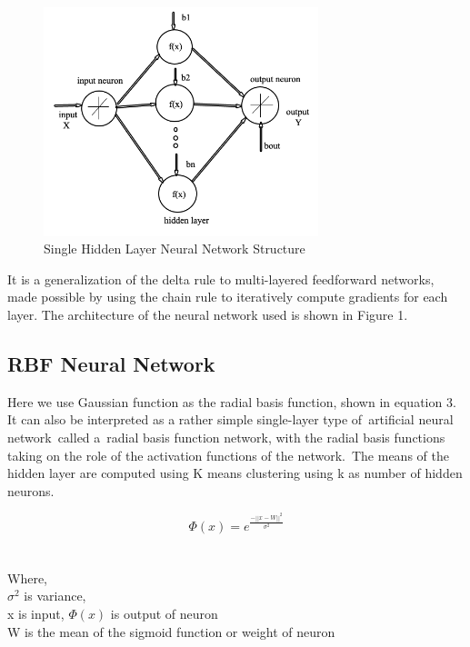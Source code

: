 \documentclass[conference]{IEEEtran}
\begin{document}
\begin{figure}[h]
\includegraphics[width=8cm]{net.png}
\centering
\caption{Single Hidden Layer Neural Network Structure\label{Fig:1}}
\end{figure}
It is a generalization of the delta rule to multi-layered feedforward networks, made possible by using the chain rule to iteratively compute gradients for each layer. The 
architecture of the neural network used is shown in Figure 1.

\subsection{RBF Neural Network}
Here we use Gaussian function as the radial basis function, shown in equation 3. It can also be interpreted as a rather simple single-layer type of artificial neural network called a radial basis function network, with the radial basis functions taking on the role of the activation functions of the network. The means of the hidden layer are computed using K means clustering using k as number of hidden neurons.

\begin{equation} \label{eq:3}
\Phi(x) =   {e} ^ {\frac{- {||x-W||} ^ {2}}{{\sigma} ^ {2}}}
\end{equation}\\
\\Where,\\
$\sigma^2$ is variance,\\
x is input, $\Phi(x)$ is output of neuron\\
W is the mean of the sigmoid function or weight of neuron\\
\end{document}
